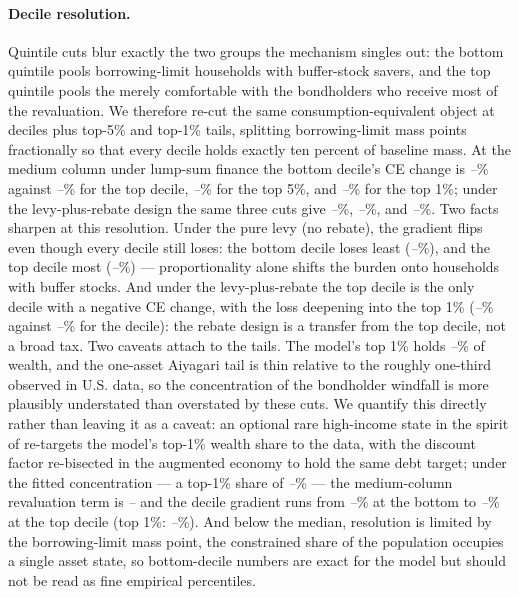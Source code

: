 \documentclass[12pt]{article}
\providecommand{\pendingnum}{\textit{--}}
\providecommand{\WDecBotMed}{\pendingnum}\providecommand{\WDecTopMed}{\pendingnum}
\providecommand{\WTopFiveMed}{\pendingnum}\providecommand{\WTopOneMed}{\pendingnum}
\providecommand{\WShareTopOneMed}{\pendingnum}
\providecommand{\RLevDecBot}{\pendingnum}\providecommand{\RLevDecTop}{\pendingnum}
\providecommand{\RRebDecBot}{\pendingnum}\providecommand{\RRebDecTop}{\pendingnum}
\providecommand{\RRebTopOne}{\pendingnum}
\providecommand{\SupTopOneShare}{\pendingnum}\providecommand{\SupNuReval}{\pendingnum}
\providecommand{\SupDecBot}{\pendingnum}\providecommand{\SupDecTop}{\pendingnum}
\providecommand{\SupTopOne}{\pendingnum}
\begin{document}
\paragraph{Decile resolution.} Quintile cuts blur exactly the two groups the
mechanism singles out: the bottom quintile pools borrowing-limit households
with buffer-stock savers, and the top quintile pools the merely comfortable
with the bondholders who receive most of the revaluation. We therefore
re-cut the same
consumption-equivalent object at deciles plus top-5\% and top-1\% tails,
splitting borrowing-limit mass points fractionally so that every decile
holds exactly ten percent of baseline mass. At the medium column under
lump-sum finance the bottom decile's CE change is \WDecBotMed\% against
\WDecTopMed\% for the top decile, \WTopFiveMed\% for the top 5\%, and
\WTopOneMed\% for the top 1\%; under the levy-plus-rebate design the same
three cuts give \RRebDecBot\%, \RRebDecTop\%, and \RRebTopOne\%. Two facts
sharpen at this resolution. Under the pure levy (no rebate), the gradient
flips even though every decile still loses: the bottom decile loses least
(\RLevDecBot\%), and the top decile most (\RLevDecTop\%) --- proportionality
alone shifts the burden onto households with buffer stocks. And under the
levy-plus-rebate the top decile is the only decile with a negative
CE change, with the loss deepening into the top 1\% (\RRebTopOne\% against
\RRebDecTop\% for the decile): the rebate design is a transfer from the top
decile, not a broad tax. Two caveats
attach to the tails. The model's top 1\% holds \WShareTopOneMed\% of wealth,
and the one-asset Aiyagari tail is thin relative to the roughly one-third
observed in U.S. data, so the concentration of the bondholder windfall is
more plausibly understated than overstated by these cuts. We quantify this
directly rather than leaving it as a caveat: an optional
rare high-income state in the spirit of \citet{castaneda2003} re-targets
the model's top-1\% wealth share to the data, with the discount factor
re-bisected in the augmented economy to hold the same debt target; under
the fitted
concentration --- a top-1\% share of \SupTopOneShare\% --- the
medium-column revaluation term is \SupNuReval{} and the decile gradient
runs from \SupDecBot\% at the bottom to \SupDecTop\% at the top decile
(top 1\%: \SupTopOne\%). And below the
median, resolution is limited by the borrowing-limit mass point, the
constrained share of the population occupies a single asset state, so
bottom-decile numbers are exact for the model but should not be read as
fine empirical percentiles.
\end{document}

